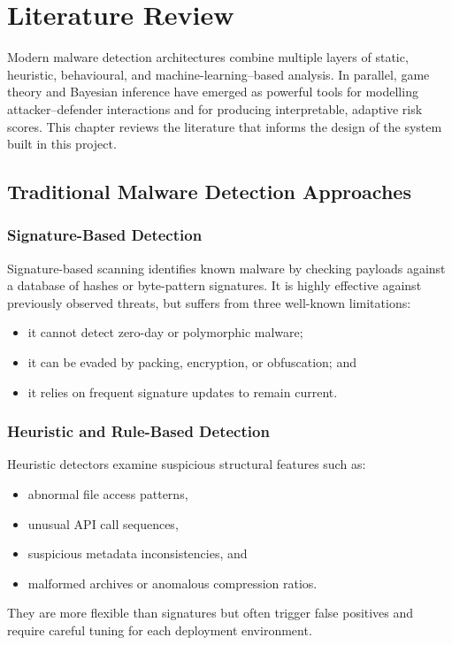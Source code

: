 \documentclass[12pt, a4paper]{report}
\begin{document}
\cleardoublepage


\chapter{Literature Review}
\label{chap:lit_review}

Modern malware detection architectures combine multiple layers of static,
heuristic, behavioural, and machine-learning--based analysis. In parallel,
game theory and Bayesian inference have emerged as powerful tools for
modelling attacker--defender interactions and for producing interpretable,
adaptive risk scores. This chapter reviews the literature that informs the
design of the system built in this project.

\section{Traditional Malware Detection Approaches}

\subsection{Signature-Based Detection}
Signature-based scanning identifies known malware by checking payloads
against a database of hashes or byte-pattern signatures. It is highly
effective against previously observed threats, but suffers from three
well-known limitations:
\begin{itemize}
    \item it cannot detect zero-day or polymorphic malware;
    \item it can be evaded by packing, encryption, or obfuscation; and
    \item it relies on frequent signature updates to remain current.
\end{itemize}

\subsection{Heuristic and Rule-Based Detection}
Heuristic detectors examine suspicious structural features such as:
\begin{itemize}
    \item abnormal file access patterns,
    \item unusual API call sequences,
    \item suspicious metadata inconsistencies, and
    \item malformed archives or anomalous compression ratios.
\end{itemize}
They are more flexible than signatures but often trigger false positives
and require careful tuning for each deployment environment.
\end{document}
